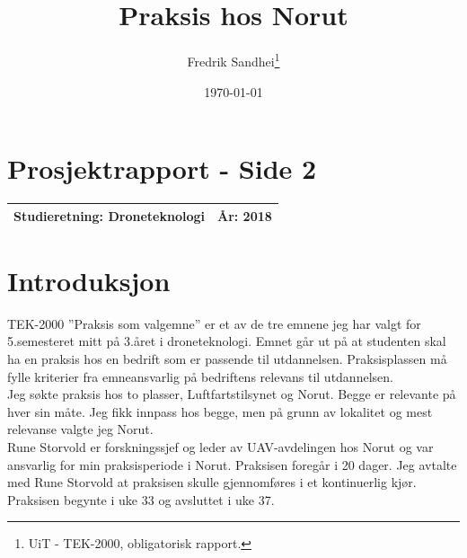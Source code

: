 \documentclass[12pt, a4paper]{article}
\begin{document}
\title{\\Praksis hos Norut}
\author{Fredrik Sandhei\thanks{UiT - TEK-2000, obligatorisk rapport.}}

\date{\today}
\maketitle
\clearpage
\section{Prosjektrapport - Side 2}

\begin{tabular}{ | l | l | }
	\hline
	\textbf{Studieretning: Droneteknologi}\hspace{5cm} & \textbf{År: 2018} \\
	\hline
\end{tabular}


\clearpage
\begin{minipage}[b]{1\linewidth}
	\tableofcontents
	\vspace{.5cm}
\end{minipage}
\begin{minipage}[b]{1\linewidth}
	\listoffigures
\end{minipage}
\clearpage

\section{Introduksjon}
TEK-2000 ''Praksis som valgemne'' er et av de tre emnene jeg har valgt for 5.semesteret mitt på 3.året i droneteknologi. Emnet går ut på at studenten skal ha en praksis hos en bedrift som er passende til utdannelsen. Praksisplassen må fylle kriterier fra emneansvarlig på bedriftens relevans til utdannelsen. \\


Jeg søkte praksis hos to plasser, Luftfartstilsynet og Norut. Begge er relevante på hver sin måte. Jeg fikk innpass hos begge, men på grunn av lokalitet og mest relevanse valgte jeg Norut.\\

Rune Storvold er forskningssjef og leder av UAV-avdelingen hos Norut og var ansvarlig for min praksisperiode i Norut. Praksisen foregår i 20 dager. Jeg avtalte med Rune Storvold at praksisen skulle gjennomføres i et kontinuerlig kjør. Praksisen begynte i uke 33 og avsluttet i uke 37.\\
\end{document}
